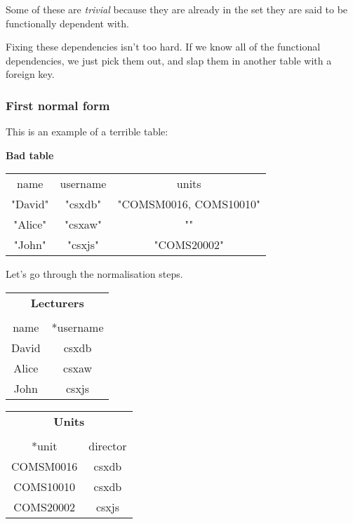 \documentclass[11pt,a4paper,titlepage,dvipsnames,cmyk]{scrartcl}
\begin{document}
Some of these are \textit{trivial} because they are already in the set
they are said to be functionally dependent with.

Fixing these dependencies isn't too hard. If we know all of the functional
dependencies, we just pick them out, and slap them in another table with a
foreign key.

\subsubsection{First normal form}%
\label{ssub:Normal-Forms}

This is an example of a terrible table:

\begin{center}
    \textbf{Bad table} 

    \begin{tabular}{c c c}
        \hline
        name & username & units \\ \hhline{===}
        "David" & "csxdb" & "COMSM0016, COMS10010" \\
        "Alice" & "csxaw" & "" \\
        "John" & "csxjs" & "COMS20002" \\ \hline
    \end{tabular}
\end{center}

Let's go through the normalisation steps.

\begin{center}
    \begin{tabular}{c c}
        \multicolumn{2}{c}{\textbf{Lecturers}} \\
        \multicolumn{2}{c}{} \\ \hline
        
        name & *username \\ \hline
        David & csxdb \\
        Alice & csxaw \\
        John & csxjs \\ \hline
    \end{tabular}
    \quad \quad
    \begin{tabular}{c c}
        \multicolumn{2}{c}{\textbf{Units}} \\
        \multicolumn{2}{c}{} \\ \hline
        
        *unit & director \\ \hline
        COMSM0016 & csxdb \\ 
        COMS10010 & csxdb \\
        COMS20002 & csxjs \\ \hline
    \end{tabular}
\end{center}
\end{document}
